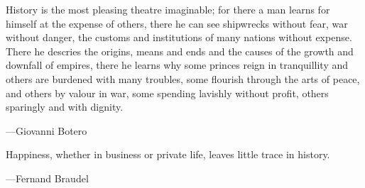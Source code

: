 \begin{bq}
\noindent History is the most pleasing theatre imaginable; for there a man learns for himself at the expense of others, there he can see shipwrecks without fear, war without danger, the customs and institutions of many nations without expense. There he descries the origins, means and ends and the causes of the growth and downfall of empires, there he learns why some princes reign in tranquillity and others are burdened with many troubles, some flourish through the arts of peace, and others by valour in war, some spending lavishly without profit, others sparingly and with dignity.
\begin{flushright}
---Giovanni Botero\nocite{botero_reason_1956}
\end{flushright}

\noindent Happiness, whether in business or private life, leaves little trace in history.
\begin{flushright}
---Fernand Braudel\nocite{braudel_1982}
\end{flushright}
\end{bq}

